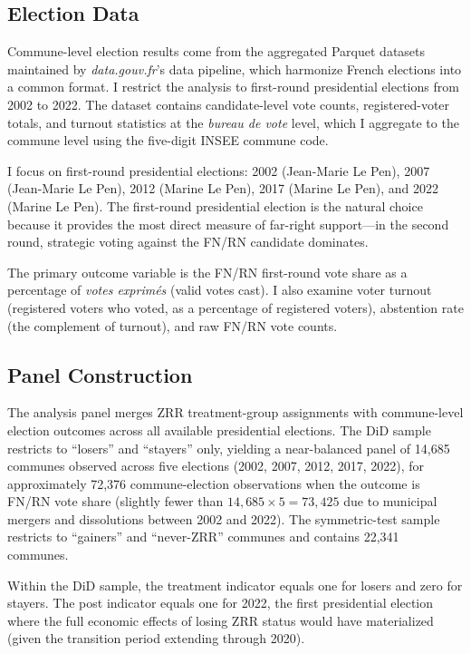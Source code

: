 \documentclass[12pt]{article}
\begin{document}
\subsection{Election Data}

Commune-level election results come from the aggregated Parquet datasets maintained by \textit{data.gouv.fr}'s data pipeline, which harmonize French elections into a common format. I restrict the analysis to first-round presidential elections from 2002 to 2022. The dataset contains candidate-level vote counts, registered-voter totals, and turnout statistics at the \textit{bureau de vote} level, which I aggregate to the commune level using the five-digit INSEE commune code.

I focus on first-round presidential elections: 2002 (Jean-Marie Le Pen), 2007 (Jean-Marie Le Pen), 2012 (Marine Le Pen), 2017 (Marine Le Pen), and 2022 (Marine Le Pen). The first-round presidential election is the natural choice because it provides the most direct measure of far-right support---in the second round, strategic voting against the FN/RN candidate dominates.

The primary outcome variable is the FN/RN first-round vote share as a percentage of \textit{votes exprim\'{e}s} (valid votes cast). I also examine voter turnout (registered voters who voted, as a percentage of registered voters), abstention rate (the complement of turnout), and raw FN/RN vote counts.

\subsection{Panel Construction}

The analysis panel merges ZRR treatment-group assignments with commune-level election outcomes across all available presidential elections. The DiD sample restricts to ``losers'' and ``stayers'' only, yielding a near-balanced panel of 14,685 communes observed across five elections (2002, 2007, 2012, 2017, 2022), for approximately 72,376 commune-election observations when the outcome is FN/RN vote share (slightly fewer than $14{,}685 \times 5 = 73{,}425$ due to municipal mergers and dissolutions between 2002 and 2022). The symmetric-test sample restricts to ``gainers'' and ``never-ZRR'' communes and contains 22,341 communes.

Within the DiD sample, the treatment indicator equals one for losers and zero for stayers. The post indicator equals one for 2022, the first presidential election where the full economic effects of losing ZRR status would have materialized (given the transition period extending through 2020).
\end{document}
